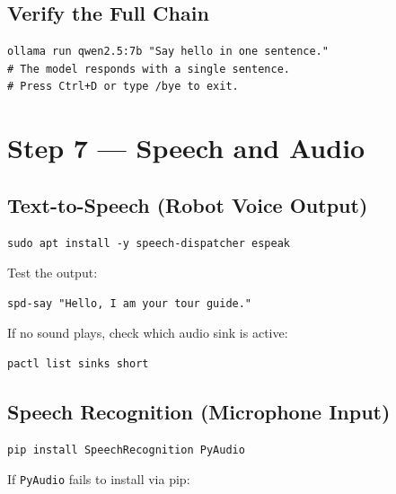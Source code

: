 \documentclass[12pt,a4paper]{report}
\begin{document}
\subsection{Verify the Full Chain}

\begin{lstlisting}[style=bashstyle, caption={End-to-end Ollama verification}]
ollama run qwen2.5:7b "Say hello in one sentence."
# The model responds with a single sentence.
# Press Ctrl+D or type /bye to exit.
\end{lstlisting}

\section{Step 7 --- Speech and Audio}

\subsection{Text-to-Speech (Robot Voice Output)}

\begin{lstlisting}[style=bashstyle, caption={Install TTS backends}]
sudo apt install -y speech-dispatcher espeak
\end{lstlisting}

Test the output:

\begin{lstlisting}[style=bashstyle]
spd-say "Hello, I am your tour guide."
\end{lstlisting}

If no sound plays, check which audio sink is active:

\begin{lstlisting}[style=bashstyle]
pactl list sinks short
\end{lstlisting}

\subsection{Speech Recognition (Microphone Input)}

\begin{lstlisting}[style=bashstyle, caption={Install speech recognition dependencies}]
pip install SpeechRecognition PyAudio
\end{lstlisting}

If \texttt{PyAudio} fails to install via pip:
\end{document}
